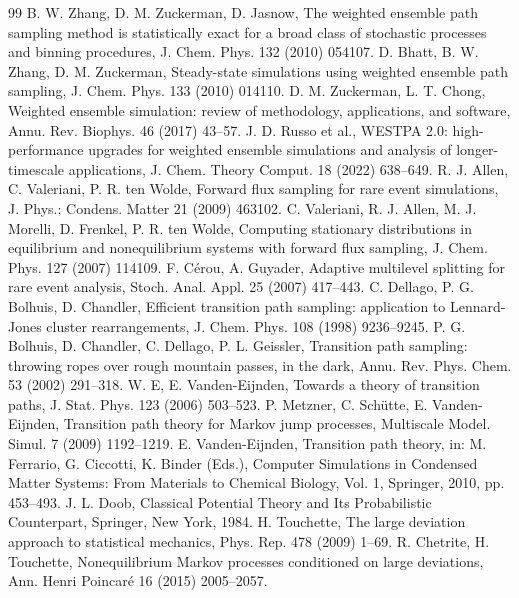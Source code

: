 \documentclass[a4paper,fleqn]{cas-sc}
\begin{document}
\begin{thebibliography}{99}
 B. W. Zhang, D. M. Zuckerman, D. Jasnow, The weighted ensemble path sampling method is statistically exact for a broad class of stochastic processes and binning procedures, J. Chem. Phys. 132 (2010) 054107.
 D. Bhatt, B. W. Zhang, D. M. Zuckerman, Steady-state simulations using weighted ensemble path sampling, J. Chem. Phys. 133 (2010) 014110.
 D. M. Zuckerman, L. T. Chong, Weighted ensemble simulation: review of methodology, applications, and software, Annu. Rev. Biophys. 46 (2017) 43--57.
 J. D. Russo et al., WESTPA 2.0: high-performance upgrades for weighted ensemble simulations and analysis of longer-timescale applications, J. Chem. Theory Comput. 18 (2022) 638--649.
 R. J. Allen, C. Valeriani, P. R. ten Wolde, Forward flux sampling for rare event simulations, J. Phys.: Condens. Matter 21 (2009) 463102.
 C. Valeriani, R. J. Allen, M. J. Morelli, D. Frenkel, P. R. ten Wolde, Computing stationary distributions in equilibrium and nonequilibrium systems with forward flux sampling, J. Chem. Phys. 127 (2007) 114109.
 F. C\'erou, A. Guyader, Adaptive multilevel splitting for rare event analysis, Stoch. Anal. Appl. 25 (2007) 417--443.
 C. Dellago, P. G. Bolhuis, D. Chandler, Efficient transition path sampling: application to Lennard-Jones cluster rearrangements, J. Chem. Phys. 108 (1998) 9236--9245.
 P. G. Bolhuis, D. Chandler, C. Dellago, P. L. Geissler, Transition path sampling: throwing ropes over rough mountain passes, in the dark, Annu. Rev. Phys. Chem. 53 (2002) 291--318.
 W. E, E. Vanden-Eijnden, Towards a theory of transition paths, J. Stat. Phys. 123 (2006) 503--523.
 P. Metzner, C. Sch\"utte, E. Vanden-Eijnden, Transition path theory for Markov jump processes, Multiscale Model. Simul. 7 (2009) 1192--1219.
 E. Vanden-Eijnden, Transition path theory, in: M. Ferrario, G. Ciccotti, K. Binder (Eds.), Computer Simulations in Condensed Matter Systems: From Materials to Chemical Biology, Vol. 1, Springer, 2010, pp. 453--493.
 J. L. Doob, Classical Potential Theory and Its Probabilistic Counterpart, Springer, New York, 1984.
 H. Touchette, The large deviation approach to statistical mechanics, Phys. Rep. 478 (2009) 1--69.
 R. Chetrite, H. Touchette, Nonequilibrium Markov processes conditioned on large deviations, Ann. Henri Poincar\'e 16 (2015) 2005--2057.

\end{thebibliography}
\end{document}
